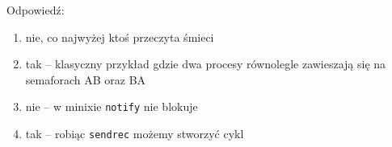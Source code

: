 Odpowiedź:
\begin{enumerate}
    \item nie, co najwyżej ktoś przeczyta śmieci
    \item tak -- klasyczny przykład gdzie dwa procesy równolegle zawieszają się na semaforach AB oraz BA
    \item nie -- w minixie \texttt{notify} nie blokuje
    \item tak -- robiąc \texttt{sendrec} możemy stworzyć cykl
\end{enumerate}